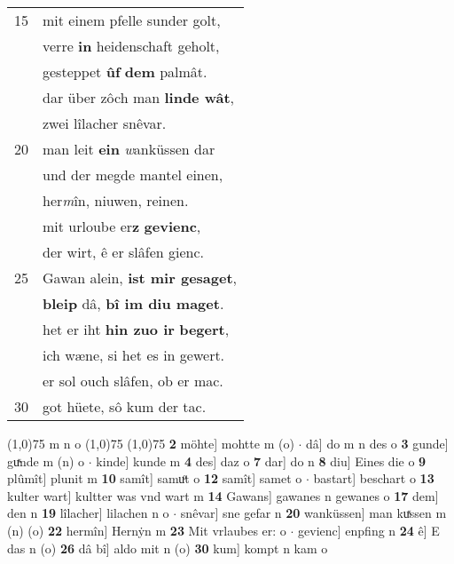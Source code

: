 \documentclass[8pt,a4paper,notitlepage]{article}
\begin{document}
\begin{table}[ht]
\begin{minipage}[t]{0.5\linewidth}
\begin{tabular}{rl}
15 & mit einem pfelle sunder golt,\\ 
 & verre \textbf{in} heidenschaft geholt,\\ 
 & gesteppet \textbf{ûf} \textbf{dem} palmât.\\ 
 & dar über zôch man \textbf{linde wât},\\ 
 & zwei lîlacher snêvar.\\ 
20 & man leit \textbf{ein} \textit{w}anküssen dar\\ 
 & und der megde mantel einen,\\ 
 & her\textit{m}în, niuwen, reinen.\\ 
 & mit urloube er\textbf{z} \textbf{gevienc},\\ 
 & der wirt, ê er slâfen gienc.\\ 
25 & Gawan alein, \textbf{ist mir gesaget},\\ 
 & \textbf{bleip} dâ, \textbf{bî im diu maget}.\\ 
 & het er iht \textbf{hin zuo ir} \textbf{begert},\\ 
 & ich wæne, si het es in gewert.\\ 
 & er sol ouch slâfen, ob er mac.\\ 
30 & got hüete, sô kum der tac.\\ 
\end{tabular}
\scriptsize
\line(1,0){75} \newline
m n o \newline
\line(1,0){75} \newline
\newline
\line(1,0){75} \newline
\textbf{2} möhte] mohtte m (o)  $\cdot$ dâ] do m n des o \textbf{3} gunde] guͯnde m (n) o  $\cdot$ kinde] kunde m \textbf{4} des] daz o \textbf{7} dar] do n \textbf{8} diu] Eines die o \textbf{9} plûmît] plunit m \textbf{10} samît] samuͦt o \textbf{12} samît] samet o  $\cdot$ bastart] beschart o \textbf{13} kulter wart] kultter was vnd wart m \textbf{14} Gawans] gawanes n gewanes o \textbf{17} dem] den n \textbf{19} lîlacher] lilachen n o  $\cdot$ snêvar] sne gefar n \textbf{20} wanküssen] man kuͯssen m (n) (o) \textbf{22} hermîn] Hernẏn m \textbf{23} Mit vrlaubes er: o  $\cdot$ gevienc] enpfing n \textbf{24} ê] E das n (o) \textbf{26} dâ bî] aldo mit n (o) \textbf{30} kum] kompt n kam o \newline
\end{minipage}
\end{table}
\newpage
\end{document}
